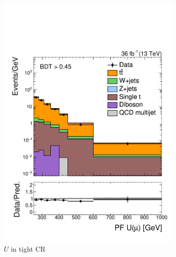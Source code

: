 \begin{figure}[]
\begin{center}
\begin{subfigure}[t]{0.32\textwidth}
            \includegraphics[width=\textwidth]{figures/monotop/prefit/singlemuontop_tight_pfUWmag_logy.pdf}
            \caption{$U$ in tight CR}
        \end{subfigure}
        \begin{subfigure}[t]{0.32\textwidth}

\end{subfigure}
\end{center}
\end{figure}
